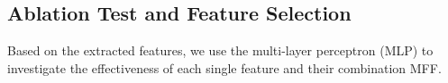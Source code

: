 

\subsection{Ablation Test and Feature Selection}
\label{sec:embedding}
Based on the extracted features, we use the multi-layer perceptron (MLP) to investigate the effectiveness of each single feature and their combination MFF.

